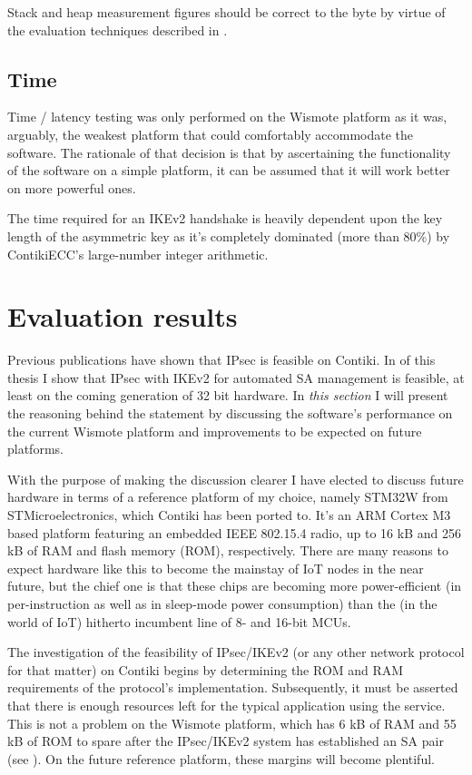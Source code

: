 \documentclass[final,a4paper,twoside,11pt,onecolumn]{report}
\begin{document}
Stack and heap measurement figures should be correct to the byte by virtue of the evaluation techniques described in .

\subsection{Time}
Time / latency testing was only performed on the Wismote platform as it was, arguably, the weakest platform that could comfortably accommodate the software. The rationale of that decision is that by ascertaining the functionality of the software on a simple platform, it can be assumed that it will work better on more powerful ones.

The time required for an IKEv2 handshake is heavily dependent upon the key length of the asymmetric key as it's completely dominated (more than 80\%) by ContikiECC's large-number integer arithmetic.


\section{Evaluation results}
Previous publications\cite{raza11securing} have shown that IPsec is feasible on Contiki. In  of this thesis I show that IPsec with IKEv2 for automated SA management is feasible, at least on the coming generation of 32 bit hardware. In \emph{this section} I will present the reasoning behind the statement by discussing the software's performance on the current Wismote platform and improvements to be expected on future platforms.

With the purpose of making the discussion clearer I have elected to discuss future hardware in terms of a reference platform of my choice, namely STM32W from STMicroelectronics, which Contiki has been ported to. It's an ARM Cortex M3 based platform featuring an embedded IEEE 802.15.4 radio, up to 16 kB and 256 kB of RAM and flash memory (ROM), respectively. There are many reasons to expect hardware like this to become the mainstay of IoT nodes in the near future, but the chief one is that these chips are becoming more power-efficient\cite{a-time-that-has-comeFIX} (in per-instruction as well as in sleep-mode power consumption) than the (in the world of IoT) hitherto incumbent line of 8- and 16-bit MCUs.

The investigation of the feasibility of IPsec/IKEv2 (or any other network protocol for that matter) on Contiki begins by determining the ROM and RAM requirements of the protocol's implementation. Subsequently, it must be asserted that there is enough resources left for the typical application using the service. This is not a problem on the Wismote platform, which has 6 kB of RAM and 55 kB of ROM to spare after the IPsec/IKEv2 system has established an SA pair (see ). On the future reference platform, these margins will become plentiful.
\end{document}
